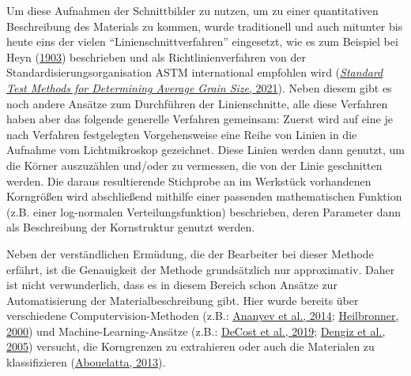 \documentclass[
  12pt,
]{book}
\begin{document}
Um diese Aufnahmen der Schnittbilder zu nutzen, um zu einer quantitativen Beschreibung des Materials zu kommen, wurde traditionell und auch mitunter bis heute eins der vielen ``Linienschnittverfahren'' eingesetzt, wie es zum Beispiel bei Heyn (\protect\hyperlink{ref-heynShortReportsMetallurgical1903}{1903}) beschrieben und als Richtlinienverfahren von der Standardisierungsorganisation ASTM international empfohlen wird (\protect\hyperlink{ref-StandardTestMethods2021}{\emph{Standard {Test Methods} for {Determining Average Grain Size}}, 2021}).
Neben diesem gibt es noch andere Ansätze zum Durchführen der Linienschnitte, alle diese Verfahren haben aber das folgende generelle Verfahren gemeinsam:
Zuerst wird auf eine je nach Verfahren festgelegten Vorgehensweise eine Reihe von Linien in die Aufnahme vom Lichtmikroskop gezeichnet. Diese Linien werden dann genutzt, um die Körner auszuzählen und/oder zu vermessen, die von der Linie geschnitten werden.
Die daraus resultierende Stichprobe an im Werkstück vorhandenen Korngrößen wird abschließend mithilfe einer passenden mathematischen Funktion (z.B. einer log-normalen Verteilungsfunktion) beschrieben, deren Parameter dann als Beschreibung der Kornstruktur genutzt werden.

Neben der verständlichen Ermüdung, die der Bearbeiter bei dieser Methode erfährt, ist die Genauigkeit der Methode grundsätzlich nur approximativ. Daher ist nicht verwunderlich, dass es in diesem Bereich schon Ansätze zur Automatisierung der Materialbeschreibung gibt.
Hier wurde bereits über verschiedene Computervision-Methoden (z.B.: \protect\hyperlink{ref-ananyevCuGdCodoped2014}{Ananyev et al., 2014}; \protect\hyperlink{ref-heilbronnerAutomaticGrainBoundary2000}{Heilbronner, 2000}) und Machine-Learning-Ansätze (z.B.: \protect\hyperlink{ref-decostHighThroughputQuantitative2019}{DeCost et al., 2019}; \protect\hyperlink{ref-dengizGrainBoundaryDetection2005}{Dengiz et al., 2005}) versucht, die Korngrenzen zu extrahieren oder auch die Materialen zu klassifizieren (\protect\hyperlink{ref-abouelattaClassificationCopperAlloys2013}{Abouelatta, 2013}).
\end{document}
